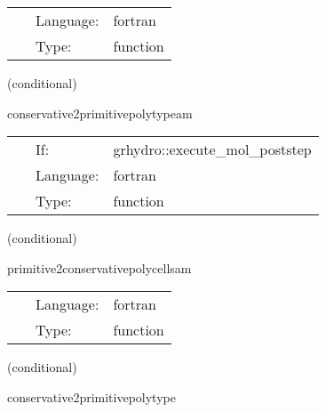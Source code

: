 \documentclass{article}
\begin{document}
\hspace{5mm}

 \begin{tabular*}{160mm}{cll} 
~ & Language:  & fortran \\ 
~ & Type:  & function \\ 
\end{tabular*} 


\vspace{5mm}

   (conditional) 

\hspace{5mm} conservative2primitivepolytypeam 

\hspace{5mm}{\it convert back to primitive variables (polytype) - mhd with avec version } 


\hspace{5mm}

 \begin{tabular*}{160mm}{cll} 
~ & If:  & grhydro::execute\_mol\_poststep \\ 
~ & Language:  & fortran \\ 
~ & Type:  & function \\ 
\end{tabular*} 


\vspace{5mm}

   (conditional) 

\hspace{5mm} primitive2conservativepolycellsam 

\hspace{5mm}{\it convert initial data given in primive variables to conserved variables - mhd with avec version } 


\hspace{5mm}

 \begin{tabular*}{160mm}{cll} 
~ & Language:  & fortran \\ 
~ & Type:  & function \\ 
\end{tabular*} 


\vspace{5mm}

   (conditional) 

\hspace{5mm} conservative2primitivepolytype 
\end{document}
